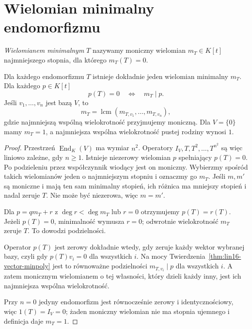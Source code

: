 \section{Wielomian minimalny endomorfizmu}
\label{sec:lin16-minpoly}

\begin{definicja}
\label{def:lin16-minpoly}
\emph{Wielomianem minimalnym} \(T\)
nazywamy moniczny wielomian
\(m_T\in K[t]\) najmniejszego stopnia,
dla którego \(m_T(T)=0\).
\end{definicja}

\begin{twierdzenie}
\label{thm:lin16-minpoly-divides}
Dla każdego endomorfizmu \(T\)
istnieje dokładnie jeden wielomian minimalny \(m_T\).
Dla każdego \(p\in K[t]\)
\[
 p(T)=0\quad\Longleftrightarrow\quad m_T\mid p.
\]
Jeśli \(v_1,\ldots,v_n\) jest bazą \(V\), to
\[
 m_T=\operatorname{lcm}
       (m_{T,v_1},\ldots,m_{T,v_n}),
\]
gdzie najmniejszą wspólną wielokrotność
przyjmujemy moniczną.
Dla \(V=\{0\}\) mamy \(m_T=1\),
a najmniejsza wspólna wielokrotność
pustej rodziny wynosi \(1\).
\end{twierdzenie}
\begin{proof}
Przestrzeń \(\operatorname{End}_K(V)\)
ma wymiar \(n^2\).
Operatory \(I_V,T,T^2,\ldots,T^{n^2}\)
są więc liniowo zależne, gdy \(n\ge1\).
Istnieje niezerowy wielomian \(p\)
spełniający \(p(T)=0\).
Po podzieleniu przez współczynnik wiodący
jest on moniczny.
Wybierzmy spośród takich wielomianów
jeden o najmniejszym stopniu i oznaczmy go \(m_T\).
Jeśli \(m,m'\) są moniczne i mają ten sam
minimalny stopień, ich różnica ma mniejszy stopień
i nadal zeruje \(T\).
Nie może być niezerowa, więc \(m=m'\).

Dla \(p=qm_T+r\) z \(\deg r<\deg m_T\)
lub \(r=0\) otrzymujemy
\(p(T)=r(T)\).
Jeżeli \(p(T)=0\), minimalność
wymusza \(r=0\); odwrotnie wielokrotność
\(m_T\) zeruje \(T\).
To dowodzi podzielności.

Operator \(p(T)\) jest zerowy
dokładnie wtedy, gdy zeruje każdy wektor
wybranej bazy, czyli
gdy \(p(T)v_i=0\) dla wszystkich \(i\).
Na mocy
Twierdzenia~\ref{thm:lin16-vector-minpoly}
jest to równoważne podzielności
\(m_{T,v_i}\mid p\) dla wszystkich \(i\).
A zatem monicznym wielomianem o tej własności,
który dzieli każdy inny, jest ich
najmniejsza wspólna wielokrotność.

Przy \(n=0\) jedyny endomorfizm
jest równocześnie zerowy i identycznościowy,
więc \(1(T)=I_V=0\);
żaden moniczny wielomian nie ma stopnia
ujemnego i definicja daje \(m_T=1\).
\end{proof}

